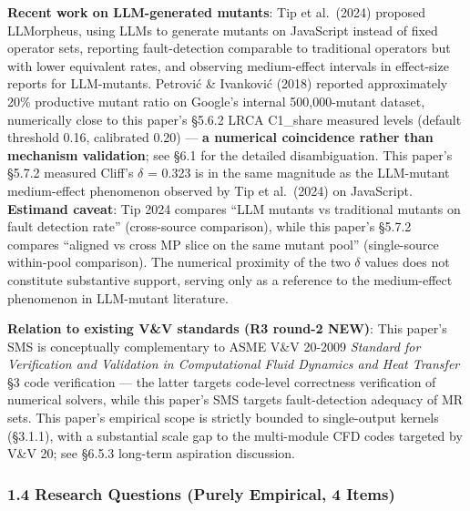 \documentclass[review,12pt,authoryear]{elsarticle}
\begin{document}
\textbf{Recent work on LLM-generated mutants}: Tip et al.~(2024)
proposed LLMorpheus, using LLMs to generate mutants on JavaScript
instead of fixed operator sets, reporting fault-detection comparable to
traditional operators but with lower equivalent rates, and observing
medium-effect intervals in effect-size reports for LLM-mutants. Petrović
\& Ivanković (2018) reported approximately 20\% productive mutant ratio
on Google's internal 500,000-mutant dataset, numerically close to this
paper's §5.6.2 LRCA C1\_share measured levels (default threshold 0.16,
calibrated 0.20) --- \textbf{a numerical coincidence rather than
mechanism validation}; see §6.1 for the detailed disambiguation. This
paper's §5.7.2 measured Cliff's $\delta$ = 0.323 is in the same magnitude as
the LLM-mutant medium-effect phenomenon observed by Tip et al.~(2024) on
JavaScript. \textbf{Estimand caveat}: Tip 2024 compares ``LLM mutants vs
traditional mutants on fault detection rate'' (cross-source comparison),
while this paper's §5.7.2 compares ``aligned vs cross MP slice on the
same mutant pool'' (single-source within-pool comparison). The numerical
proximity of the two $\delta$ values does not constitute substantive support,
serving only as a reference to the medium-effect phenomenon in
LLM-mutant literature.

\textbf{Relation to existing V\&V standards (R3 round-2 NEW)}: This
paper's SMS is conceptually complementary to ASME V\&V 20-2009
\emph{Standard for Verification and Validation in Computational Fluid
Dynamics and Heat Transfer} §3 code verification --- the latter targets
code-level correctness verification of numerical solvers, while this
paper's SMS targets fault-detection adequacy of MR sets. This paper's
empirical scope is strictly bounded to single-output kernels (§3.1.1),
with a substantial scale gap to the multi-module CFD codes targeted by
V\&V 20; see §6.5.3 long-term aspiration discussion.

\subsubsection{1.4 Research Questions (Purely Empirical, 4
Items)}\label{research-questions-purely-empirical-4-items}
\end{document}
